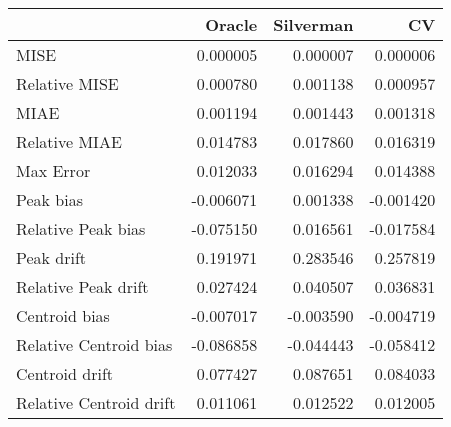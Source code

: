 \begin{tabular}{lrrr}
  \hline
 & Oracle & Silverman & CV \\ 
  \hline
MISE & 0.000005 & 0.000007 & 0.000006 \\ 
  Relative MISE & 0.000780 & 0.001138 & 0.000957 \\ 
  MIAE & 0.001194 & 0.001443 & 0.001318 \\ 
  Relative MIAE & 0.014783 & 0.017860 & 0.016319 \\ 
  Max Error & 0.012033 & 0.016294 & 0.014388 \\ 
  Peak bias & -0.006071 & 0.001338 & -0.001420 \\ 
  Relative Peak bias & -0.075150 & 0.016561 & -0.017584 \\ 
  Peak drift & 0.191971 & 0.283546 & 0.257819 \\ 
  Relative Peak drift & 0.027424 & 0.040507 & 0.036831 \\ 
  Centroid bias & -0.007017 & -0.003590 & -0.004719 \\ 
  Relative Centroid bias & -0.086858 & -0.044443 & -0.058412 \\ 
  Centroid drift & 0.077427 & 0.087651 & 0.084033 \\ 
  Relative Centroid drift & 0.011061 & 0.012522 & 0.012005 \\ 
   \hline
\end{tabular}
